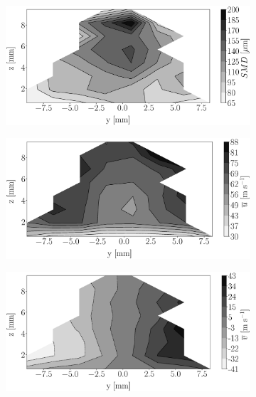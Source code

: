 \begin{figure}[h!]
\flushleft
\begin{subfigure}[b]{0.22\textwidth}
	\centering
   \includegraphics[scale=0.17]{./part2_developments/figures_ch5_resolved_JICF/injectors_SLI/uG100_dx20_x15_SMD_map.eps}
\end{subfigure}
   \hspace{0.17in}
\begin{subfigure}[b]{0.22\textwidth}
	\centering
   \includegraphics[scale=0.17]{./part2_developments/figures_ch5_resolved_JICF/injectors_SLI/uG100_dx20_x15_ux_mean_map.eps}
\end{subfigure}
   \hspace{0.17in}
\begin{subfigure}[b]{0.22\textwidth}
	\centering
   \includegraphics[scale=0.17]{./part2_developments/figures_ch5_resolved_JICF/injectors_SLI/uG100_dx20_x15_uy_mean_map.eps}

\end{subfigure}
\end{figure}
